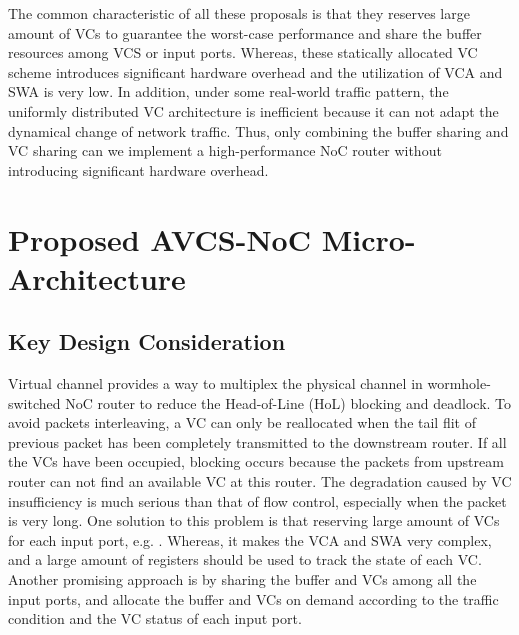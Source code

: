 \documentclass[10pt,conference]{IEEEtran}
\begin{document}
The common characteristic of all these proposals is that they reserves large amount of VCs to guarantee the worst-case performance and share the buffer resources among VCS or input ports. Whereas, these statically allocated VC scheme introduces significant hardware overhead and the utilization of VCA and SWA is very low. In addition, under some real-world traffic pattern, the uniformly distributed VC architecture is inefficient because it can not adapt the dynamical change of network traffic. Thus, only combining the buffer sharing and VC sharing can we implement a high-performance NoC router without introducing significant hardware overhead.

\section{Proposed AVCS-NoC Micro-Architecture}\label{implemented}
\subsection{Key Design Consideration}
Virtual channel provides a way to multiplex the physical channel in wormhole-switched NoC router to reduce the Head-of-Line (HoL) blocking and deadlock. To avoid packets interleaving, a VC can only be reallocated when the tail flit of previous packet has been completely transmitted to the downstream router. If all the VCs have been occupied, blocking occurs because the packets from upstream router can not find an available VC at this router. The degradation caused by VC insufficiency is much serious than that of flow control, especially when the packet is very long. One solution to this problem is that reserving large amount of VCs for each input port, e.g. \cite{NPKV06}\cite{4555894}\cite{5770788}\cite{Neishaburi:2009:RAN:1531542.1531658}\cite{6310960}. Whereas, it makes the VCA and SWA very complex, and a large amount of registers should be used to track the state of each VC. Another promising approach is by sharing the buffer and VCs among all the input ports, and allocate the buffer and VCs on demand according to the traffic condition and the VC status of each input port.
\end{document}
